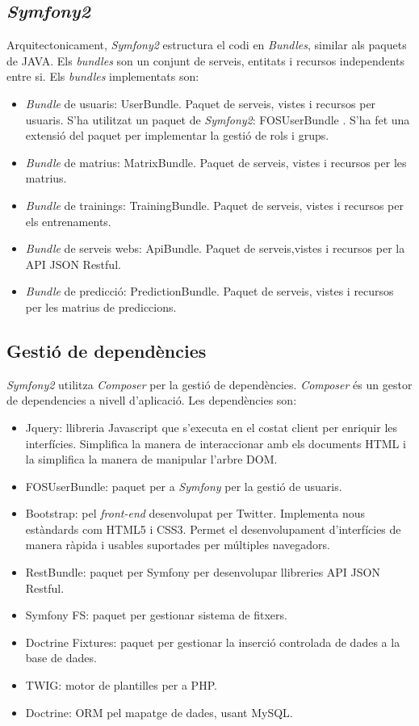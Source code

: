 \subsection{\textit{Symfony2}}
Arquitectonicament, \textit{Symfony2} estructura el codi en \textit{Bundles}, similar als paquets de JAVA. Els \textit{bundles} son un conjunt de serveis, entitats i recursos independents entre si. Els \textit{bundles} implementats son:
\begin{itemize}
\item \textit{Bundle} de usuaris: UserBundle. Paquet de serveis, vistes i recursos per usuaris. S'ha utilitzat un paquet de \textit{Symfony2}: FOSUserBundle \cite{fosuserbundle}. S'ha fet una extensi\'{o} del paquet per implementar la gesti\'{o} de rols i grups.
\item \textit{Bundle} de matrius: MatrixBundle. Paquet de serveis, vistes i recursos per les matrius.
\item \textit{Bundle} de trainings: TrainingBundle. Paquet de serveis, vistes i recursos per els entrenaments.
\item \textit{Bundle} de serveis webs: ApiBundle. Paquet de serveis,vistes i recursos per la API JSON Restful. 
\item \textit{Bundle} de predicci\'{o}: PredictionBundle. Paquet de serveis, vistes i recursos per les matrius de prediccions.
\end{itemize}

\subsection{Gesti\'{o} de depend\`{e}ncies} 
\textit{Symfony2} utilitza \textit{Composer} per la gesti\'{o} de depend\`{e}ncies.\cite{composer} \textit{Composer} \'{e}s un gestor de dependencies a nivell d'aplicaci\'{o}. Les depend\`{e}ncies son:
\begin{itemize}
\item Jquery: llibreria Javascript que s'executa en el costat client per enriquir les interfícies. Simplifica la manera de interaccionar amb els documents HTML i la simplifica la manera de manipular l'arbre DOM.\cite{jquery}
\item FOSUserBundle: paquet per a \textit{Symfony} per la gesti\'{o} de usuaris.\cite{fosuserbundle}
\item Bootstrap:  pel \textit{front-end} desenvolupat per Twitter. Implementa nous estàndards com HTML5 i CSS3. Permet el desenvolupament d'interf\'{i}cies de manera r\`{a}pida i usables suportades per múltiples navegadors.
\item RestBundle: paquet per Symfony per desenvolupar llibreries API JSON Restful.
\item Symfony FS: paquet per gestionar sistema de fitxers.
\item Doctrine Fixtures: paquet per gestionar la inserci\'{o} controlada de dades a la base de dades.
\item TWIG: motor de plantilles per a PHP.\cite{twig}
\item Doctrine: ORM pel mapatge de dades, usant MySQL.\cite{mysql}
\end{itemize}

